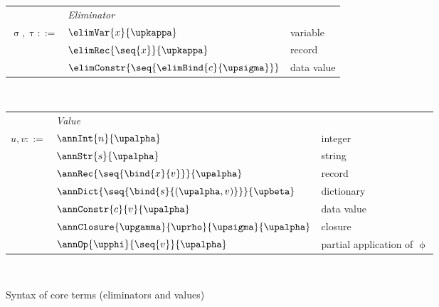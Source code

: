 \begin{figure}
    {\small
    \begin{minipage}[t]{0.48\textwidth}
        \begin{tabularx}{\textwidth}{rL{2.7cm}L{3cm}}
            &\textit{Eliminator}&
            \\
            $\upsigma, \uptau ::=$
            &
            $\elimVar{x}{\upkappa}$
            &
            variable
            \\
            &
            $\elimRec{\seq{x}}{\upkappa}$
            &
            record
            \\
            &
            $\elimConstr{\seq{\elimBind{c}{\upsigma}}}$
            &
            data value
            \\[2mm]
        \end{tabularx}
    \end{minipage}\\[3mm]%
    \begin{minipage}[t]{0.48\textwidth}
        \begin{tabularx}{\textwidth}{rL{2.7cm}L{3cm}}
            &\textit{Value}&
      \\
      $u, v ::=$
      &
      $\annInt{n}{\upalpha}$
      &
      integer
      \\
      &
      $\annStr{s}{\upalpha}$
      &
      string
      \\
      &
      $\annRec{\seq{\bind{x}{v}}}{\upalpha}$
      &
      record
      \\
      &
      $\annDict{\seq{\bind{s}{(\upalpha, v)}}}{\upbeta}$
      &
      dictionary
      \\
      &
      $\annConstr{c}{v}{\upalpha}$
      &
      data value
      \\
      &
      $\annClosure{\upgamma}{\uprho}{\upsigma}{\upalpha}$
      &
      closure
      \\
      &
      $\annOp{\upphi}{\seq{v}}{\upalpha}$
      &
      partial application of $\upphi$
      \\[0mm]
      \end{tabularx}
   \end{minipage}\\[3mm]%
    }
    \caption{Syntax of core terms (eliminators and values)}
\end{figure}
